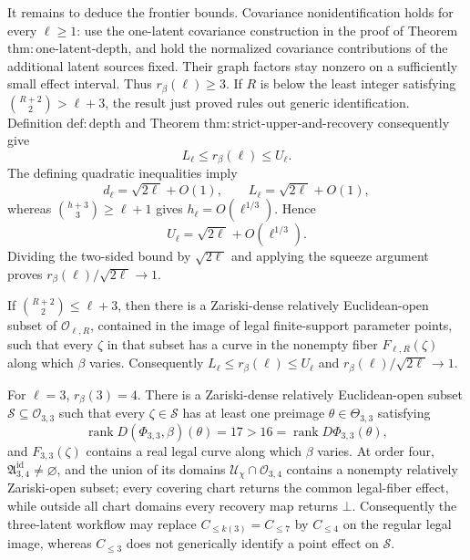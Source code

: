 It remains to deduce the frontier bounds.  Covariance nonidentification holds for every \(\ell\ge1\): use the one-latent covariance construction in the proof of Theorem \(\mathrm{thm:one\mbox{-}latent\mbox{-}depth}\), and hold the normalized covariance contributions of the additional latent sources fixed.  Their graph factors stay nonzero on a sufficiently small effect interval.  Thus \(r_\beta(\ell)\ge3\).  If \(R\) is below the least integer satisfying \(\binom{R+2}{2}>\ell+3\), the result just proved rules out generic identification.  Definition \(\mathrm{def:depth}\) and Theorem \(\mathrm{thm:strict\mbox{-}upper\mbox{-}and\mbox{-}recovery}\) consequently give
\[
 L_\ell\le r_\beta(\ell)\le U_\ell.
\]
The defining quadratic inequalities imply
\[
 d_\ell=\sqrt{2\ell}+O(1),
 \qquad
 L_\ell=\sqrt{2\ell}+O(1),
\]
whereas \(\binom{h+3}{3}\ge\ell+1\) gives \(h_\ell=O(\ell^{1/3})\).  Hence
\[
 U_\ell=\sqrt{2\ell}+O(\ell^{1/3}).
\]
Dividing the two-sided bound by \(\sqrt{2\ell}\) and applying the squeeze argument proves \(r_\beta(\ell)/\sqrt{2\ell}\to1\).

If \(\binom{R+2}{2}\le\ell+3\), then there is a Zariski-dense relatively Euclidean-open subset of \(\mathcal O_{\ell,R}\), contained in the image of legal finite-support parameter points, such that every \(\zeta\) in that subset has a curve in the nonempty fiber \(F_{\ell,R}(\zeta)\) along which \(\beta\) varies.  Consequently \(L_\ell\le r_\beta(\ell)\le U_\ell\) and \(r_\beta(\ell)/\sqrt{2\ell}\to1\).

For \(\ell=3\), \(r_\beta(3)=4\).  There is a Zariski-dense relatively Euclidean-open subset \(\mathcal S\subseteq\mathcal O_{3,3}\) such that every \(\zeta\in\mathcal S\) has at least one preimage \(\theta\in\Theta_{3,3}\) satisfying
\[
 \operatorname{rank}D(\Phi_{3,3},\beta)(\theta)=17
 >16=\operatorname{rank}D\Phi_{3,3}(\theta),
\]
and \(F_{3,3}(\zeta)\) contains a real legal curve along which \(\beta\) varies.  At order four, \(\mathfrak A^{\mathrm{id}}_{3,4}\ne\varnothing\), and the union of its domains \(\mathcal U_\chi\cap\mathcal O_{3,4}\) contains a nonempty relatively Zariski-open subset; every covering chart returns the common legal-fiber effect, while outside all chart domains every recovery map returns \(\bot\).  Consequently the three-latent workflow may replace \(C_{\le k(3)}=C_{\le7}\) by \(C_{\le4}\) on the regular legal image, whereas \(C_{\le3}\) does not generically identify a point effect on \(\mathcal S\).

